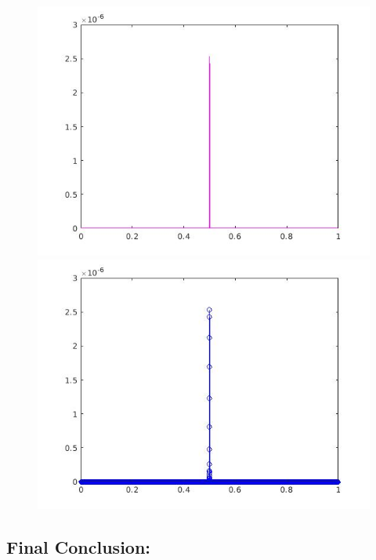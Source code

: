 \documentclass[a4paper,11pt]{article}
\begin{document}
\begin{figure}[!hp]
\centering
\begin{minipage}{.5\textwidth}
  \centering
  \includegraphics[width=1\linewidth]{images/lab2_87.jpg}
\end{minipage}%
\begin{minipage}{.5\textwidth}
  \centering
  \includegraphics[width=1\linewidth]{images/lab2_88.jpg}
\end{minipage}
\end{figure}

\newpage

\subsection{Final Conclusion:}
\end{document}
